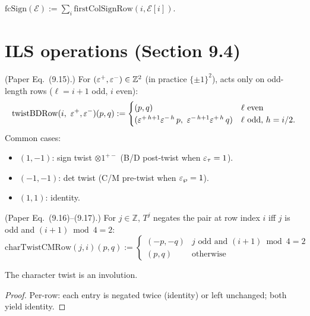 \begin{definition}
  \label{def:firstColSign}
  \leanok
  $\mathrm{fcSign}(\mathcal{E}) := \sum_i \mathrm{firstColSignRow}(i, \mathcal{E}[i])$.
\end{definition}

\section{ILS operations (Section 9.4)}

\begin{definition}
  \label{def:twistBD}
  \leanok
  (Paper Eq.~(9.15).) For $(\varepsilon^+, \varepsilon^-) \in \mathbb{Z}^2$ (in practice $\{\pm 1\}^2$),
  acts only on odd-length rows ($\ell = i + 1$ odd, $i$ even):
  \[
    \mathrm{twistBDRow}(i,\ \varepsilon^+, \varepsilon^-)(p, q) :=
    \begin{cases}
      (p, q) & \ell\text{ even} \\
      (\varepsilon^{+\,h + 1} \varepsilon^{-\,h}\, p,\ \varepsilon^{-\,h + 1} \varepsilon^{+\,h}\, q) & \ell\text{ odd, } h = i / 2.
    \end{cases}
  \]
  Common cases:
  \begin{itemize}
    \item $(1, -1)$: sign twist $\otimes 1^{+-}$ (B/D post-twist when $\varepsilon_\tau = 1$).
    \item $(-1, -1)$: det twist (C/M pre-twist when $\varepsilon_\wp = 1$).
    \item $(1, 1)$: identity.
  \end{itemize}
\end{definition}

\begin{definition}
  \label{def:charTwistCM}
  \leanok
  (Paper Eq.~(9.16)--(9.17).) For $j \in \mathbb{Z}$, $T^j$ negates the pair at row index $i$ iff $j$ is odd and $(i + 1) \bmod 4 = 2$:
  \[
    \mathrm{charTwistCMRow}(j, i)(p, q) :=
    \begin{cases}
      (-p, -q) & j\text{ odd and } (i + 1) \bmod 4 = 2 \\
      (p, q) & \text{otherwise}
    \end{cases}
  \]
\end{definition}

\begin{lemma}[$T^2 = \mathrm{id}$]
  \label{lem:T_squared}
  \leanok
  The character twist is an involution.
\end{lemma}
\begin{proof}
  \leanok
  Per-row: each entry is negated twice (identity) or left unchanged; both yield identity.
\end{proof}

